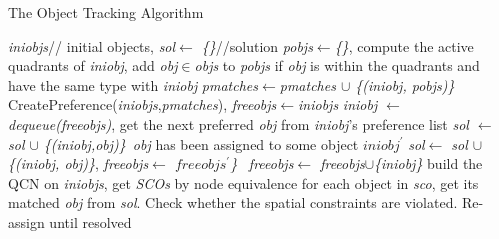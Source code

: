 \documentclass[letterpaper]{article}
\begin{document}
\begin{algorithm}[!]\footnotesize
\caption{The Object Tracking Algorithm}\label{algo}
\begin{algorithmic}[1]
\State \emph{iniobjs}// initial objects, \emph{sol$\leftarrow$ \{\}}//solution
\label{MA}
\State \emph{pobjs$\leftarrow$\{\}}, compute the active quadrants of \emph{iniobj}, add \emph{obj$\in$objs} to \emph{pobjs} if \emph{obj} is within the quadrants and have the same type with \emph{iniobj} 
\State \emph{pmatches$\leftarrow$pmatches $\cup$ \{(iniobj, pobjs)\}}\label{SetPossible}
\EndFor
\State CreatePreference(\emph{iniobjs},\emph{pmatches})\label{calPref}, \emph{freeobjs$\leftarrow$iniobjs}
\State \emph{iniobj $\leftarrow$ dequeue(freeobjs)}, get the next preferred \emph{obj} from \emph{iniobj}'s preference list  
   \emph{sol $\leftarrow$ sol $\cup$ \{(iniobj,obj)\}}
  \Else\,\emph{obj} has been assigned to some object \emph{$iniobj^{\prime}$}
   \emph{sol$\leftarrow$ sol $\cup$ \{(iniobj, obj)\}}, \emph{freeobjs$\leftarrow$ $freeobjs^{\prime}$\}}
  \Else\, 
   \emph{freeobjs$\leftarrow$ freeobjs$\cup$\{iniobj\}}
\EndIf 
\EndIf
\EndWhile\label{stableMarriage}
\State build the QCN on \emph{iniobjs}, get \emph{SCOs} by node equivalence \label{getSCO}
\label{CommonMotion}
\State for each object in \emph{sco}, get its matched \emph{obj} from \emph{sol}. Check whether the spatial constraints are violated. Re-assign until resolved 
\EndFor
\EndProcedure
%

\end{algorithmic}
\end{algorithm}
\clearpage
\newpage


 
\end{document}
